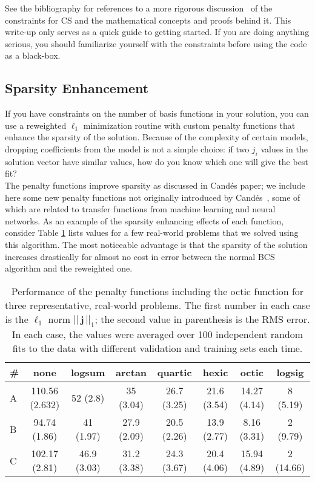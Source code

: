 \documentclass[paper=a4, fontsize=11pt]{scrartcl} %
\newcommand{\vectornorm}[1]{\left|\left|\,#1\,\right|\right|}
\numberwithin{equation}{section} %
\numberwithin{figure}{section} %
\numberwithin{table}{section} %
\begin{document}
See the bibliography for references to a more rigorous discussion~\cite{Ji:2008dd} of
the constraints for CS and the mathematical concepts and proofs behind
it. This write-up only serves as a quick guide to getting started. If
you are doing anything serious, you should familiarize yourself with
the constraints before using the code as a black-box.

\subsection{Sparsity Enhancement}

If you have constraints on the number of basis functions in your
solution, you can use a reweighted $\ell_1$ minimization routine with
custom penalty functions that enhance the sparsity of the
solution. Because of the complexity of certain models, dropping
coefficients from the model is not a simple choice: if two $j_i$
values in the solution vector have similar values, how do you know
which one will give the best fit?\\

The penalty functions improve sparsity as discussed in Cand\'es paper;
we include here some new penalty functions not originally introduced
by Cand\'es~\cite{Candes:2008hh}, some of which are related to transfer functions from
machine learning and neural networks. As an example of the sparsity
enhancing effects of each function, consider Table
\ref{tab:PenaltyFunctionTable}
lists values for a few
real-world problems that we solved using this algorithm. The most
noticeable advantage is that the sparsity of the solution increases
drastically for almost no cost in error between the normal BCS
algorithm and the reweighted one.

\begin{table}
\centering
\begin{tabular}{| l || c | c | c | c | c | c | c |}
   \hline
   \# & none  & logsum & arctan & quartic & hexic & octic & logsig \\ \hline
   A & 110.56 (2.632) & 52 (2.8) & 35 (3.04) & 26.7 (3.25) & 21.6 (3.54) & 14.27 (4.14) & 8 (5.19) \\ \hline
   B & 94.74 (1.86) & 41 (1.97) & 27.9 (2.09) & 20.5 (2.26) & 13.9 (2.77) & 8.16 (3.31) & 2 (9.79) \\ \hline
   C & 102.17 (2.81) & 46.9 (3.03) & 31.2 (3.38) & 24.3 (3.67) & 20.4 (4.06) & 15.94 (4.89) & 2 (14.66) \\ \hline
   \hline
\end{tabular}
\caption{Performance of the penalty functions including the octic
  function for three representative, real-world problems. The first
  number in each case is the $\ell_1$ norm $\vectornorm{\mathbf{j}}_1$; the
  second value in parenthesis is the RMS error. In each case, the
  values were averaged over 100 independent random fits to the data
  with different validation and training sets each time. }
\label{tab:PenaltyFunctionTable}
\end{table}
\end{document}
